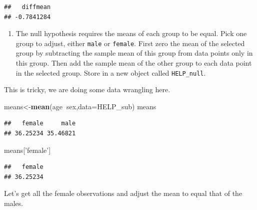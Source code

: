\documentclass[
]{book}
\newenvironment{Shaded}{\begin{snugshade}}{\end{snugshade}}
\newcommand{\DataTypeTok}[1]{\textcolor[rgb]{0.13,0.29,0.53}{#1}}
\newcommand{\KeywordTok}[1]{\textcolor[rgb]{0.13,0.29,0.53}{\textbf{#1}}}
\newcommand{\NormalTok}[1]{#1}
\newcommand{\OperatorTok}[1]{\textcolor[rgb]{0.81,0.36,0.00}{\textbf{#1}}}
\newcommand{\StringTok}[1]{\textcolor[rgb]{0.31,0.60,0.02}{#1}}
\providecommand{\tightlist}{%
  \setlength{\itemsep}{0pt}\setlength{\parskip}{0pt}}
\begin{document}
\begin{verbatim}
##   diffmean 
## -0.7841284
\end{verbatim}

\begin{enumerate}
\def\labelenumi{\alph{enumi}.}
\setcounter{enumi}{1}
\tightlist
\item
  The null hypothesis requires the means of each group to be equal. Pick one group to adjust, either \texttt{male} or \texttt{female}. First zero the mean of the selected group by subtracting the sample mean of this group from data points only in this group. Then add the sample mean of the other group to each data point in the selected group. Store in a new object called \texttt{HELP\_null}.
\end{enumerate}

This is tricky, we are doing some data wrangling here.

\begin{Shaded}
\begin{Highlighting}[]
\NormalTok{means<-}\KeywordTok{mean}\NormalTok{(age}\OperatorTok{~}\NormalTok{sex,}\DataTypeTok{data=}\NormalTok{HELP_sub)}
\NormalTok{means}
\end{Highlighting}
\end{Shaded}

\begin{verbatim}
##   female     male 
## 36.25234 35.46821
\end{verbatim}

\begin{Shaded}
\begin{Highlighting}[]
\NormalTok{means[}\StringTok{'female'}\NormalTok{]}
\end{Highlighting}
\end{Shaded}

\begin{verbatim}
##   female 
## 36.25234
\end{verbatim}

Let's get all the female observations and adjust the mean to equal that of the males.

\begin{Shaded}
\end{Shaded}
\end{document}
